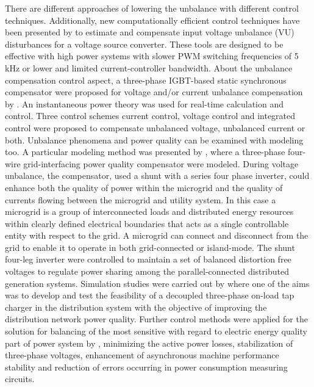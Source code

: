 There are different approaches of lowering the unbalance with different control techniques. Additionally, new computationally efficient control techniques have been presented by \cite{lee2009new} to estimate and compensate input voltage unbalance (VU) disturbances for a voltage source converter. These tools are designed to be effective with high power systems with slower PWM switching frequencies of 5 kHz or lower and limited current-controller bandwidth. About the unbalance compensation control aspect, a three-phase IGBT-based static synchronous compensator were proposed for voltage and/or current unbalance compensation by \cite{xu2010voltage}. An instantaneous power theory was used for real-time calculation and control. Three control schemes current control, voltage control and integrated control were proposed to compensate unbalanced voltage, unbalanced current or both. Unbalance phenomena and power quality can be examined with modeling too. A particular modeling method was presented by \cite{li2005microgrid}, where a three-phase four-wire grid-interfacing power quality compensator were modeled. During voltage unbalance, the compensator, used a shunt with a series four phase inverter, could enhance both the quality of power within the microgrid and the quality of currents flowing between the microgrid and utility system. In this case a microgrid is a group of interconnected loads and distributed energy resources within clearly defined electrical boundaries that acts as a single controllable entity with respect to the grid. A microgrid can connect and disconnect from the grid to enable it to operate in both grid-connected or island-mode. The shunt four-leg inverter were controlled to maintain a set of balanced distortion free voltages to regulate power sharing among the parallel-connected distributed generation systems. Simulation studies were carried out by \cite{Hu2016264} where one of the aims was to develop and test the feasibility of a decoupled three-phase on-load tap charger in the distribution system with the objective of improving the distribution network power quality. Further control methods were applied for the solution for balancing of the most sensitive with regard to electric energy quality part of power system by \cite{korovkin2016uimethod}, minimizing the active power losses, stabilization of three-phase voltages, enhancement of asynchronous machine performance stability and reduction of errors occurring in power consumption measuring circuits.\\

